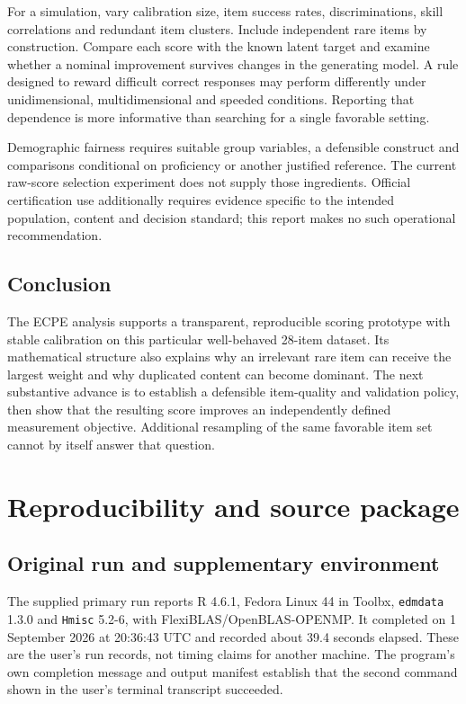 \documentclass[11pt,a4paper,oneside,headings=normal,parskip=half]{scrreprt}
\newcommand{\code}[1]{\nolinkurl{#1}}
\begin{document}
For a simulation, vary calibration size, item success rates, discriminations, skill correlations and redundant item clusters. Include independent rare items by construction. Compare each score with the known latent target and examine whether a nominal improvement survives changes in the generating model. A rule designed to reward difficult correct responses may perform differently under unidimensional, multidimensional and speeded conditions. Reporting that dependence is more informative than searching for a single favorable setting.

Demographic fairness requires suitable group variables, a defensible construct and comparisons conditional on proficiency or another justified reference. The current raw-score selection experiment does not supply those ingredients. Official certification use additionally requires evidence specific to the intended population, content and decision standard; this report makes no such operational recommendation.

\section{Conclusion}
The ECPE analysis supports a transparent, reproducible scoring prototype with stable calibration on this particular well-behaved 28-item dataset. Its mathematical structure also explains why an irrelevant rare item can receive the largest weight and why duplicated content can become dominant. The next substantive advance is to establish a defensible item-quality and validation policy, then show that the resulting score improves an independently defined measurement objective. Additional resampling of the same favorable item set cannot by itself answer that question.

\chapter{Reproducibility and source package}\label{ch:reproduce}
\section{Original run and supplementary environment}
The supplied primary run reports R 4.6.1, Fedora Linux 44 in Toolbx, \code{edmdata} 1.3.0 and \code{Hmisc} 5.2-6, with FlexiBLAS/OpenBLAS-OPENMP. It completed on 1 September 2026 at 20:36:43 UTC and recorded about 39.4 seconds elapsed. These are the user's run records, not timing claims for another machine. The program's own completion message and output manifest establish that the second command shown in the user's terminal transcript succeeded.
\end{document}
